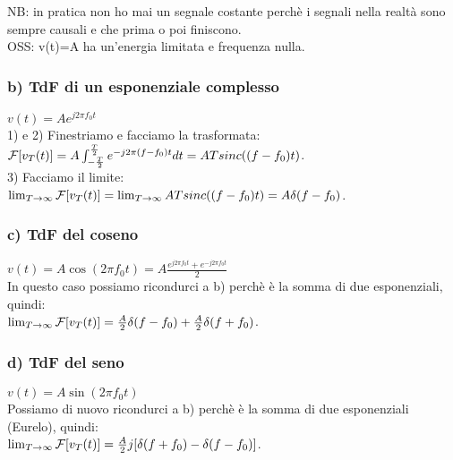 	
	
	NB: in pratica non ho mai un segnale costante perchè i segnali nella realtà sono sempre causali e che prima o poi finiscono.\\
	OSS: v(t)=A ha un'energia limitata e frequenza nulla.\\
	
	\subsubsection{b) TdF di un esponenziale complesso}
	$ v(t) = A e^{j2\pi f_0 t}$\\
	1) e 2) Finestriamo e facciamo la trasformata:\\
	 $ \mathcal{F} [ v_T(t)  ] = A \int_{- \frac{T}{2}}^{ \frac{T}{2}} e^{-j2\pi (f-f_0) t} dt  = AT sinc( (f-f_0) t) $.\\
	3) Facciamo il limite: $ \lim_{T \to \infty} \mathcal{F} [ v_T(t)  ]  = \lim_{T \to \infty} AT sinc( (f-f_0) t) = A \delta (f-f_0)$.\\
	
	\subsubsection{c) TdF del coseno}
	$ v(t) = A \cos (2 \pi f_0 t) = A \frac{e^{j 2 \pi f_0 t} + e^{-j 2 \pi f_0 t}}{ 2}$\\
	In questo caso possiamo ricondurci a b) perchè è la somma di due esponenziali, quindi:\\
	$ \lim_{T \to \infty} \mathcal{F} [ v_T(t)  ]  = \frac{A}{2} \delta (f-f_0) + \frac{A}{2} \delta (f+f_0)$.\\
	
	
	\subsubsection{d) TdF del seno}
	$ v(t) = A \sin (2 \pi f_0 t) $\\
	Possiamo di nuovo ricondurci a b) perchè è la somma di due esponenziali (Eurelo), quindi:\\
	$ \lim_{T \to \infty} \mathcal{F} [ v_T(t)  ]  = \frac{A}{2}j[ \delta (f+f_0) - \delta (f-f_0) ]$.\\
	
	
